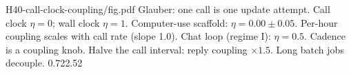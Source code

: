 {H40-call-clock-coupling/fig.pdf}
{Glauber: one call is one update attempt. Call clock $\eta=0$; wall clock $\eta=1$.}
{Computer-use scaffold: $\eta=0.00\pm0.05$. Per-hour coupling scales with call rate (slope 1.0). Chat loop (regime I): $\eta=0.5$.}
{Cadence is a coupling knob. Halve the call interval: reply coupling $\times1.5$. Long batch jobs decouple.}
{0.72}{2.52}

